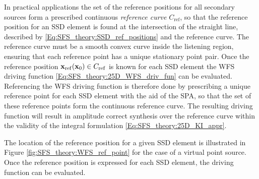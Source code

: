 In practical applications the set of the reference positions for all secondary sources form a prescribed continuous \emph{reference curve} $C_{\mathrm{ref}}$, so that the reference position for an SSD element is found at the intersection of the straight line, described by \eqref{Eq:SFS_theory:SSD_ref_positions} and the reference curve.
The reference curve must be a smooth convex curve inside the listening region, ensuring that each reference point has a unique stationary point pair.
Once the reference position $\mathbf{x}_{\mathrm{ref}}(\mathbf{x}_0) \in C_{\mathrm{ref}}$ is known for each SSD element the WFS driving function \eqref{Eq:SFS_theory:25D_WFS_driv_fun} can be evaluated.
Referencing the WFS driving function is therefore done by prescribing a unique reference point for each SSD element with the aid of the SPA, so that the set of these reference points form the continuous reference curve.
The resulting driving function will result in amplitude correct synthesis over the reference curve within the validity of the integral formulation \eqref{Eq:SFS_theory:25D_KI_appr}.

The location of the reference position for a given SSD element is illustrated in Figure \ref{fig:SFS_theory:WFS_ref_point} for the case of a virtual point source. 
Once the reference position is expressed for each SSD element, the driving function can be evaluated.

